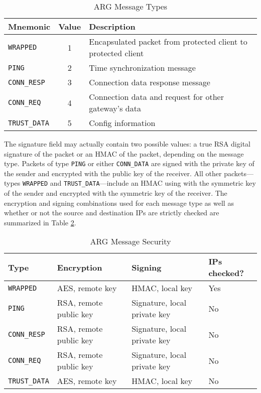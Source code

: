 \begin{table}
\caption{\ac{ARG} Message Types}
\label{tbl:arg_protocol_types}
\begin{tabular}{l|c|l}
Mnemonic & Value & Description\\
\hline
\texttt{WRAPPED} & 1 & Encapsulated packet from protected client to protected client\\
\texttt{PING} & 2 & Time synchronization message\\
\texttt{CONN\_RESP} & 3 & Connection data response message\\
\texttt{CONN\_REQ} & 4 & Connection data and request for other gateway's data\\ 
\texttt{TRUST\_DATA} & 5 & Config information 
\end{tabular}
\end{table}

\par The signature field may actually contain two possible values: a true \ac{RSA} digital signature of the packet or an \ac{HMAC} of the packet, depending on the message type. Packets of type \texttt{PING} or either \texttt{CONN\_DATA} are signed with the private key of the sender and encrypted with the public key of the receiver. All other packets---types \texttt{WRAPPED} and \texttt{TRUST\_DATA}---include an \ac{HMAC} using with the symmetric key of the sender and encrypted with the symmetric key of the receiver. The encryption and signing combinations used for each message type as well as whether or not the source and destination \ac{IP}s are strictly checked are summarized in Table \ref{tbl:arg_protocol_security}.

\begin{table}
\caption{\ac{ARG} Message Security}
\label{tbl:arg_protocol_security}
\centering
\begin{tabular}{l|l|l|l}
Type & Encryption & Signing & \ac{IP}s checked?\\
\hline
\texttt{WRAPPED} & AES, remote key & HMAC, local key & Yes\\
\texttt{PING} & RSA, remote public key & Signature, local private key & No\\
\texttt{CONN\_RESP} & RSA, remote public key & Signature, local private key & No\\
\texttt{CONN\_REQ} & RSA, remote public key & Signature, local private key & No\\
\texttt{TRUST\_DATA} & AES, remote key & HMAC, local key & No\\
\end{tabular}
\end{table}


